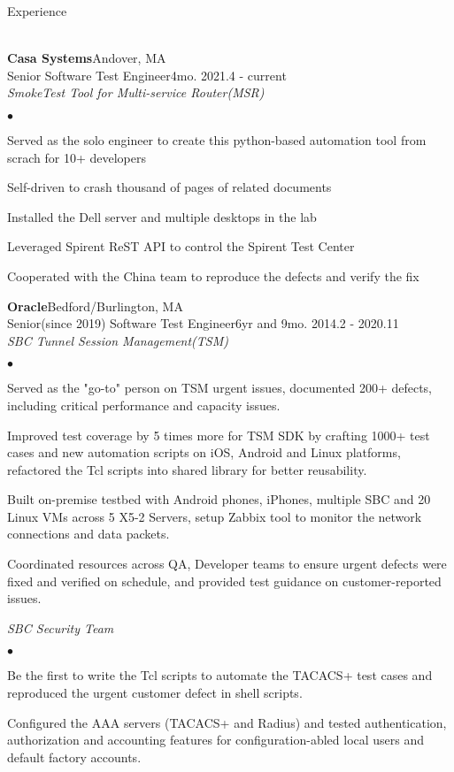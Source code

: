 \documentclass[10pt]{article}
\newcommand{\lineunder}{\vspace*{-8pt}\\\hspace*{-18pt}\hrulefill\\}
\newcommand{\header}[1]{{\hspace*{-15pt}\vspace*{6pt}\large{{#1}}}\vspace*{-6pt}\lineunder}
\newcommand{\company}[5]{
    \large{\textbf{#1}}\hfill \small{#3}\\
    #2\hfill \small{#4}\small{#5}\\
}
\newcommand{\project}[1]{\checkmark\normalsize{{\emph{#1}}}\\}
\newenvironment{achievements}
    {\begin{list}
        {$\bullet$}{\topsep 0pt \itemsep -1pt}} 
    {\end{list}}
\begin{document}
\header{Experience}


\vspace*{10pt}
\company{Casa Systems}{Senior Software Test Engineer}{Andover, MA}{4mo. }{2021.4 - current}
\project{SmokeTest Tool for Multi-service Router(MSR)}
 \begin{achievements}
\item Served as the solo engineer to create this python-based automation tool from scrach for 10+ developers
\item Self-driven to crash thousand of pages of related documents 
\item Installed the Dell server and multiple desktops in the lab
\item Leveraged Spirent ReST API to control the Spirent Test Center
\item Cooperated with the China team to reproduce the defects and verify the fix
 \end{achievements}

\vspace*{5pt}

\company{Oracle}{Senior(since 2019) Software Test Engineer}{Bedford/Burlington, MA}{6yr and 9mo. }{2014.2 - 2020.11}

\project{SBC Tunnel Session Management(TSM)}
  \begin{achievements}
\item Served as the "go-to" person on TSM urgent issues, documented 200+ defects, including critical performance and capacity issues.
\item Improved test coverage by 5 times more for TSM SDK by crafting 1000+ test cases and new automation scripts on iOS, Android and Linux platforms, refactored the Tcl scripts into shared library for better reusability.
\item Built on-premise testbed with Android phones, iPhones, multiple SBC and 20 Linux VMs across 5 X5-2 Servers, setup Zabbix tool to monitor the network connections and data packets.
\item Coordinated resources across QA, Developer teams to ensure urgent defects were fixed and verified on schedule, and provided test guidance on customer-reported issues.
  \end{achievements}

\project{SBC Security Team}
  \begin{achievements}
\item Be the first to write the Tcl scripts to automate the TACACS+ test cases and reproduced the urgent customer defect in shell scripts.
\item Configured the AAA servers (TACACS+ and Radius) and tested authentication, authorization and accounting features for configuration-abled local users and default factory accounts.
  \end{achievements}
\end{document}
